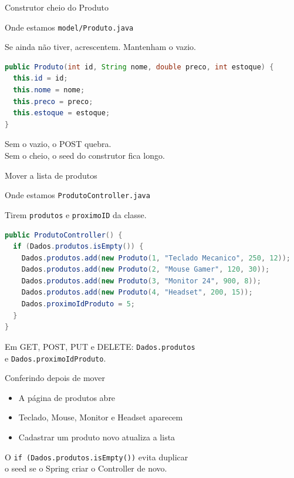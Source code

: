 \documentclass[aspectratio=169,11pt]{beamer}
\newcommand{\onde}[1]{%
  \begin{block}{Onde estamos}
    #1
  \end{block}
}
\begin{document}
\begin{frame}[fragile]{Construtor cheio do Produto}
  \onde{\texttt{model/Produto.java}}

  Se ainda não tiver, acrescentem. Mantenham o vazio.

\begin{lstlisting}[language=Java,basicstyle=\ttfamily\footnotesize]
public Produto(int id, String nome, double preco, int estoque) {
  this.id = id;
  this.nome = nome;
  this.preco = preco;
  this.estoque = estoque;
}
\end{lstlisting}

  Sem o vazio, o POST quebra.\\
  Sem o cheio, o seed do construtor fica longo.
\end{frame}

\begin{frame}[fragile]{Mover a lista de produtos}
  \onde{\texttt{ProdutoController.java}}

  Tirem \texttt{produtos} e \texttt{proximoID} da classe.

\begin{lstlisting}[language=Java,basicstyle=\ttfamily\scriptsize]
public ProdutoController() {
  if (Dados.produtos.isEmpty()) {
    Dados.produtos.add(new Produto(1, "Teclado Mecanico", 250, 12));
    Dados.produtos.add(new Produto(2, "Mouse Gamer", 120, 30));
    Dados.produtos.add(new Produto(3, "Monitor 24", 900, 8));
    Dados.produtos.add(new Produto(4, "Headset", 200, 15));
    Dados.proximoIdProduto = 5;
  }
}
\end{lstlisting}

  Em GET, POST, PUT e DELETE: \texttt{Dados.produtos}\\
  e \texttt{Dados.proximoIdProduto}.
\end{frame}

\begin{frame}{Conferindo depois de mover}
  \begin{itemize}
    \item [ ] A página de produtos abre
    \item [ ] Teclado, Mouse, Monitor e Headset aparecem
    \item [ ] Cadastrar um produto novo atualiza a lista
  \end{itemize}

  \vspace{0.5em}
  O \texttt{if (Dados.produtos.isEmpty())} evita duplicar\\
  o seed se o Spring criar o Controller de novo.
\end{frame}
\end{document}

